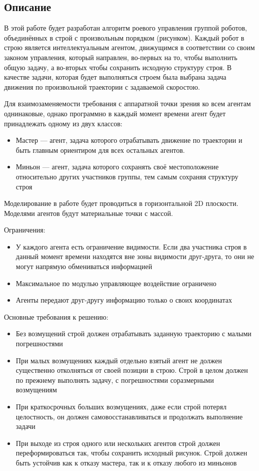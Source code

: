 \documentclass[a4paper, 14pt]{extarticle}
\begin{document}
\subsection{Описание}
В этой работе будет разработан алгоритм роевого управления группой роботов, объединённых в строй с произвольным порядком (рисунком). Каждый робот в строю является интеллектуальным агентом, движущимся в соответствии со своим законом управления, который направлен, во-первых на то, чтобы выполнить общую задачу, а во-вторых чтобы сохранить исходную структуру строя. В качестве задачи, которая будет выполняться строем была выбрана задача движения по произвольной траектории с задаваемой скоростою. \par
Для взаимозаменяемости требования с аппаратной точки зрения ко всем агентам однинаковые, однако программно в каждый момент времени агент будет принадлежать одному из двух классов:
\begin{itemize}
	\item Мастер — агент, задача которого отрабатывать движение по траектории и быть главным ориентиром для всех остальных агентов.
	\item Миньон — агент, задача которого сохранять своё местоположение относительно других участников группы, тем самым сохраняя структуру строя
\end{itemize}
\par
Моделирование в работе будет проводиться в горизонтальной 2D плоскости. Моделями агентов будут материальные точки с массой.
\par
Ограничения:
\begin{itemize}
	\item У каждого агента есть ограничение видимости. Если два участника строя в данный момент времени находятся вне зоны видимости друг-друга, то они не могут напрямую обмениваться информацией
	\item Максимальное по модулью управляющее воздействие ограничено
	\item Агенты передают друг-другу информацию только о своих координатах
\end{itemize}
Основные требования к решению:
\begin{itemize}
	\item Без возмущений строй должен отрабатывать заданную траекторию с малыми погрешностями
	\item При малых возмущениях каждый отдельно взятый агент не должен существенно отколняться от своей позиции в строю. Строй в целом должен по прежнему выполнять задачу, с погрешностями соразмерными возмущениям
	\item При краткосрочных больших возмущениях, даже если строй потерял целостность, он должен самовосстанавливаться и продолжать выполнение задачи
	\item При выходе из строя одного или нескольких агентов строй должен переформироваться так, чтобы сохранить исходный рисунок. Строй должен быть устойчив как к отказу мастера, так и к отказу любого из миньонов
\end{itemize}
\end{document}
